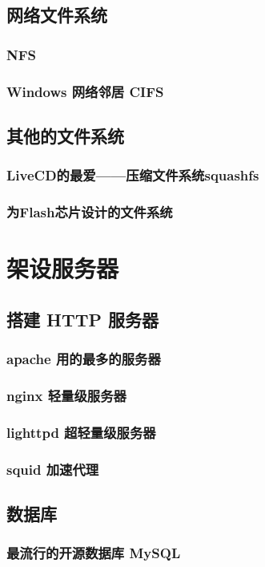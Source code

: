 \documentclass[amstex,twoside]{ctexbook}
\begin{document}
\section{  网络文件系统	}
\subsection{  NFS	}
\subsection{  Windows 网络邻居 CIFS	}
\section{  其他的文件系统	}
\subsection{  LiveCD的最爱——压缩文件系统squashfs}
\subsection{  为Flash芯片设计的文件系统}

\chapter{架设服务器}
\section{  搭建 HTTP 服务器}
\subsection{  apache 用的最多的服务器}
\subsection{ nginx 轻量级服务器}
\subsection{ lighttpd 超轻量级服务器}
\subsection{ squid 加速代理	}
\section{  数据库	}
\subsection{  最流行的开源数据库 MySQL}
\end{document}
